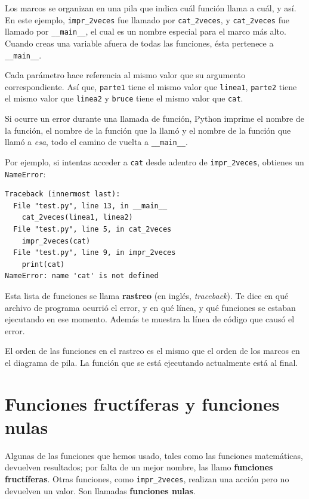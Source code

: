 \documentclass[10pt]{book}
\begin{document}
Los marcos se organizan en una pila que indica cuál función
llama a cuál, y así.  En este ejemplo, \verb"impr_2veces"
fue llamado por \verb"cat_2veces", y \verb"cat_2veces" fue llamado por
\verb"__main__", el cual es un nombre especial para el marco más alto.  Cuando
creas una variable afuera de todas las funciones, ésta pertenece a
\verb"__main__".


Cada parámetro hace referencia al mismo valor que su argumento
correspondiente.  Así que, {\tt parte1} tiene el mismo valor que
{\tt linea1}, {\tt parte2} tiene el mismo valor que {\tt linea2}
y {\tt bruce} tiene el mismo valor que {\tt cat}.

Si ocurre un error durante una llamada de función, Python imprime el
nombre de la función, el nombre de la función que la llamó
y el nombre de la función que llamó a {\em esa}, todo el
camino de vuelta a \verb"__main__".

Por ejemplo, si intentas acceder a {\tt cat} desde adentro de
\verb"impr_2veces", obtienes un {\tt NameError}:

\begin{verbatim}
Traceback (innermost last):
  File "test.py", line 13, in __main__
    cat_2veces(linea1, linea2)
  File "test.py", line 5, in cat_2veces
    impr_2veces(cat)
  File "test.py", line 9, in impr_2veces
    print(cat)
NameError: name 'cat' is not defined
\end{verbatim}
%
Esta lista de funciones se llama {\bf rastreo} (en inglés, {\em traceback}).  Te dice en qué
archivo de programa ocurrió el error, y en qué línea, y qué funciones
se estaban ejecutando en ese momento.  Además te muestra la línea de código que
causó el error.

El orden de las funciones en el rastreo es el mismo que el
orden de los marcos en el diagrama de pila.  La función que se está
ejecutando actualmente está al final.


\section{Funciones fructíferas y funciones nulas}

Algunas de las funciones que hemos usado, tales como las funciones matemáticas, devuelven
resultados; por falta de un mejor nombre, las llamo {\bf funciones
  fructíferas}.  Otras funciones, como \verb"impr_2veces", realizan una
acción pero no devuelven un valor.  Son llamadas {\bf funciones
  nulas}.
\end{document}
